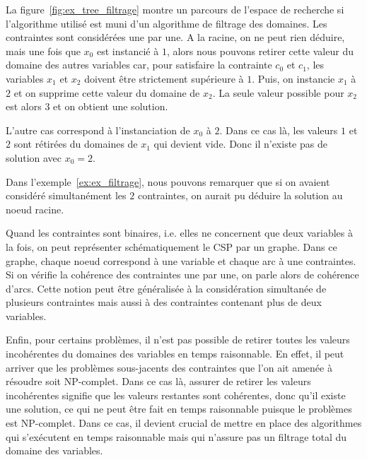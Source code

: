 \begin{ex}
La figure~\ref{fig:ex_tree_filtrage} montre un parcours de l'espace de
recherche si l'algorithme utilisé est muni d'un algorithme de filtrage
des domaines. Les contraintes sont considérées une par une.  A
la racine, on ne peut rien déduire, mais une fois que $x_0$ est
instancié à $1$, alors nous pouvons retirer cette valeur du domaine
des autres variables car, pour satisfaire la contrainte $c_0$ et
$c_1$, les variables $x_1$ et $x_2$ doivent être strictement
supérieure à $1$. Puis, on instancie $x_1$ à $2$ et on supprime cette
valeur du domaine de $x_2$. La seule valeur possible pour $x_2$ est
alors $3$ et on obtient une solution.

L'autre cas correspond à l'instanciation de $x_0$ à $2$. Dans ce cas
là, les valeurs $1$ et $2$ sont rétirées du domaines de $x_1$ qui
devient vide. Donc il n'existe pas de solution avec $x_0=2$.
\end{ex}

Dans l'exemple~\ref{ex:ex_filtrage}, nous pouvons remarquer que si on
avaient considéré simultanément les $2$ contraintes, on
aurait pu déduire la solution au noeud racine. 

Quand les contraintes sont binaires, i.e. elles ne concernent que deux
variables à la fois, on peut représenter schématiquement le CSP par un
graphe. Dans ce graphe, chaque noeud correspond à une variable et
chaque arc à une contraintes. Si on vérifie la cohérence des
contraintes une par une, on parle alors de cohérence d'arcs. Cette
notion peut être généralisée à la considération simultanée de
plusieurs contraintes mais aussi à des contraintes contenant plus de
deux variables.

Enfin, pour certains problèmes, il n'est pas possible de retirer
toutes les valeurs incohérentes du domaines des variables en temps
raisonnable. En effet, il peut arriver que les problèmes sous-jacents
des contraintes que l'on ait amenée à résoudre soit NP-complet. Dans
ce cas là, assurer de retirer les valeurs incohérentes signifie que
les valeurs restantes sont cohérentes, donc qu'il existe une
solution, ce qui ne peut être fait en temps raisonnable puisque le
problèmes est NP-complet.  Dans ce cas, il devient crucial de mettre
en place des algorithmes qui s'exécutent en temps raisonnable mais qui
n'assure pas un filtrage total du domaine des variables. 